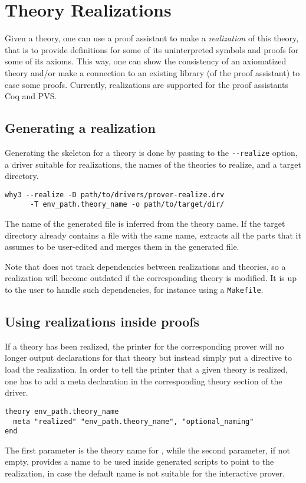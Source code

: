\chapter{Theory Realizations}
\label{chap:realizations}

Given a \why theory, one can use a proof assistant to make a
\emph{realization} of this theory, that is to provide definitions for
some of its uninterpreted symbols and proofs for some of its
axioms. This way, one can show the consistency of an axiomatized
theory and/or make a connection to an existing library (of the proof
assistant) to ease some proofs.
Currently, realizations are supported for the proof assistants Coq and PVS.

\section{Generating a realization}

Generating the skeleton for a theory is done by passing to \why the
\verb+--realize+ option, a driver suitable for realizations, the names of
the theories to realize, and a target directory.

\begin{verbatim}
why3 --realize -D path/to/drivers/prover-realize.drv
      -T env_path.theory_name -o path/to/target/dir/
\end{verbatim}
The name of the generated file is inferred from the theory name. If the
target directory already contains a file with the same name, \why
extracts all the parts that it assumes to be user-edited and merges them in
the generated file.

Note that \why does not track dependencies between realizations and
theories, so a realization will become outdated if the corresponding
theory is modified.
It is up to the user to handle such dependencies, for instance using a
\texttt{Makefile}.

\section{Using realizations inside proofs}

If a theory has been realized, the \why printer for the corresponding prover
will no longer output declarations for that theory but instead simply put
a directive to load the realization. In order to tell the printer
that a given theory is realized, one has to add a meta declaration in the
corresponding theory section of the driver.
\begin{verbatim}
theory env_path.theory_name
  meta "realized" "env_path.theory_name", "optional_naming"
end
\end{verbatim}
The first parameter is the theory name for \why, while the second
parameter, if not empty, provides a name to be used inside generated
scripts to point to the realization, in case the default name is not
suitable for the interactive prover.

